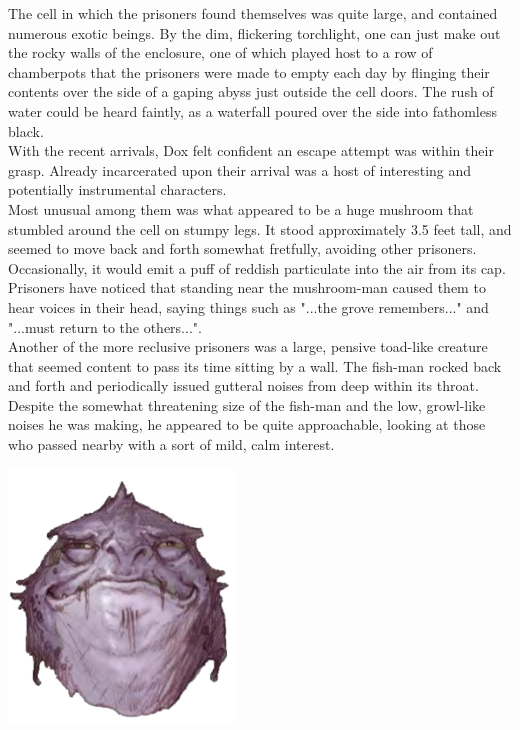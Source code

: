 \documentclass[letterpaper,10pt,twoside,twocolumn,openany]{book}
\begin{document}
The cell in which the prisoners found themselves was quite large, and contained numerous exotic beings. By the dim, flickering torchlight, one can just make out the rocky walls of the enclosure, one of which played host to a row of chamberpots that the prisoners were made to empty each day by flinging their contents over the side of a gaping abyss just outside the cell doors. The rush of water could be heard faintly, as a waterfall poured over the side into fathomless black.\\

With the recent arrivals, Dox felt confident an escape attempt was within their grasp. Already incarcerated upon their arrival was a host of interesting and potentially instrumental characters.\\

Most unusual among them was what appeared to be a huge mushroom that stumbled around the cell on stumpy legs. It stood approximately 3.5 feet tall, and seemed to move back and forth somewhat fretfully, avoiding other prisoners. Occasionally, it would emit a puff of reddish particulate into the air from its cap. Prisoners have noticed that standing near the mushroom-man caused them to hear voices in their head, saying things such as "...the grove remembers..." and "...must return to the others...".\\

Another of the more reclusive prisoners was a large, pensive toad-like creature that seemed content to pass its time sitting by a wall. The fish-man rocked back and forth and periodically issued gutteral noises from deep within its throat. Despite the somewhat threatening size of the fish-man and the low, growl-like noises he was making, he appeared to be quite approachable, looking at those who passed nearby with a sort of mild, calm interest.
\begin{center}
	\includegraphics[width=0.45\textwidth]{img/src/fish_man.png}
\end{center}
\end{document}
